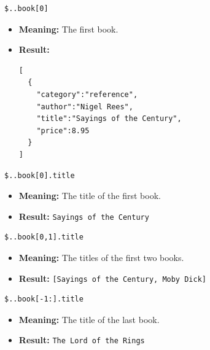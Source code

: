 \documentclass{article}
\newenvironment{codetemplate}[1][]{%
  \mybasecolorbox[#1]
  \itshape
}{%
  \endmybasecolorbox
}
\begin{document}
\begin{codetemplate}{}
\begin{verbatim}
$..book[0]
\end{verbatim}
\end{codetemplate}
\begin{itemize}
    \item \textbf{Meaning:} The first book.
    \item \textbf{Result:}
\begin{verbatim}
[
  {
    "category":"reference",
    "author":"Nigel Rees",
    "title":"Sayings of the Century",
    "price":8.95
  }
]
\end{verbatim}

\end{itemize}

\begin{codetemplate}{}
\begin{verbatim}
$..book[0].title
\end{verbatim}
\end{codetemplate}
\begin{itemize}
    \item \textbf{Meaning:} The title of the first book.
    \item \textbf{Result:} \verb+Sayings of the Century+
\end{itemize}

\begin{codetemplate}{}
\begin{verbatim}
$..book[0,1].title
\end{verbatim}
\end{codetemplate}
\begin{itemize}
    \item \textbf{Meaning:} The titles of the first two books.
    \item \textbf{Result:} \verb+[Sayings of the Century, Moby Dick]+
\end{itemize}

\begin{codetemplate}{}
\begin{verbatim}
$..book[-1:].title
\end{verbatim}
\end{codetemplate}
\begin{itemize}
    \item \textbf{Meaning:} The title of the last book.
    \item \textbf{Result:} \verb+The Lord of the Rings+
\end{itemize}
\end{document}
